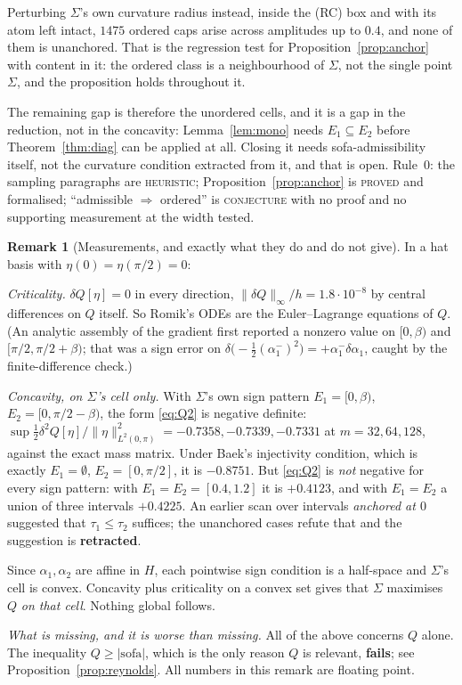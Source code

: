 \documentclass[11pt]{article}
\theoremstyle{definition}
\newtheorem{remark}[theorem]{Remark}
\newcommand{\Sig}{\Sigma}
\begin{document}
Perturbing $\Sig$'s own curvature radius instead, inside the (RC) box and with its atom
left intact, $1475$ ordered caps arise across amplitudes up to $0.4$, and none of them is
unanchored. That is the regression test for Proposition~\ref{prop:anchor} with content in
it: the ordered class is a neighbourhood of $\Sig$, not the single point $\Sig$, and the
proposition holds throughout it.

The remaining gap is therefore the unordered cells, and it is a gap in the reduction, not
in the concavity: Lemma~\ref{lem:mono} needs $E_1\subseteq E_2$ before
Theorem~\ref{thm:diag} can be applied at all. Closing it needs sofa-admissibility itself,
not the curvature condition extracted from it, and that is open. Rule~0: the sampling
paragraphs are \textsc{heuristic}; Proposition~\ref{prop:anchor} is \textsc{proved} and
formalised; ``admissible $\Rightarrow$ ordered'' is \textsc{conjecture} with no proof and
no supporting measurement at the width tested.

\begin{remark}[Measurements, and exactly what they do and do not give]\label{rem:conc}
In a hat basis with $\eta(0)=\eta(\pi/2)=0$:

\emph{Criticality.} $\delta Q[\eta]=0$ in every direction, $\|\delta Q\|_\infty/h
=1.8\cdot10^{-8}$ by central differences on $Q$ itself. So Romik's ODEs are the
Euler--Lagrange equations of $Q$. (An analytic assembly of the gradient first reported a
nonzero value on $[0,\beta)$ and $[\pi/2,\pi/2+\beta)$; that was a sign error on
$\delta\bigl(-\tfrac12(\alpha_1^-)^2\bigr)=+\alpha_1^-\delta\alpha_1$, caught by the
finite-difference check.)

\emph{Concavity, on $\Sig$'s cell only.} With $\Sig$'s own sign pattern
$E_1=[0,\beta)$, $E_2=[0,\pi/2-\beta)$, the form \eqref{eq:Q2} is negative definite:
$\sup\tfrac12\delta^2Q[\eta]/\|\eta\|^2_{L^2(0,\pi)}=-0.7358,-0.7339,-0.7331$ at
$m=32,64,128$, against the exact mass matrix. Under Baek's injectivity condition, which is
exactly $E_1=\emptyset$, $E_2=[0,\pi/2]$, it is $-0.8751$. But \eqref{eq:Q2} is
\emph{not} negative for every sign pattern: with $E_1=E_2=[0.4,1.2]$ it is $+0.4123$, and
with $E_1=E_2$ a union of three intervals $+0.4225$. An earlier scan
over intervals \emph{anchored at $0$} suggested that $\tau_1\le\tau_2$ suffices; the
unanchored cases refute that and the suggestion is \textbf{retracted}.

Since $\alpha_1,\alpha_2$ are affine in $H$, each pointwise sign condition is a
half-space and $\Sig$'s cell is convex. Concavity plus criticality on a convex set gives
that $\Sig$ maximises $Q$ \emph{on that cell}. Nothing global follows.

\emph{What is missing, and it is worse than missing.} All of the above concerns $Q$
alone. The inequality $Q\ge|\text{sofa}|$, which is the only reason $Q$ is relevant,
\textbf{fails}; see Proposition~\ref{prop:reynolds}. All numbers in this remark are
floating point.
\end{remark}
\end{document}
